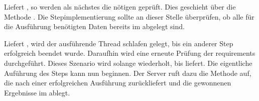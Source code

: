 Liefert  , so werden als nächstes die nötigen
 geprüft.
Dies geschieht über die Methode .
Die Stepimplementierung sollte an dieser Stelle überprüfen, ob alle für die
Ausführung benötigten Daten bereits im  abgelegt sind.

Liefert  , wird der ausführende Thread
schlafen gelegt, bis ein anderer Step erfolgreich beendet wurde.
Daraufhin wird eine erneute Prüfung der requirements durchgeführt.
Dieses Szenario wird solange wiederholt, bis 
 liefert.
Die eigentliche Auführung des Steps kann nun beginnen.
Der Server ruft dazu die Methode  auf, die nach einer erfolgreichen
Ausführung  zurückliefert und die gewonnenen Ergebnisse im
 ablegt.
